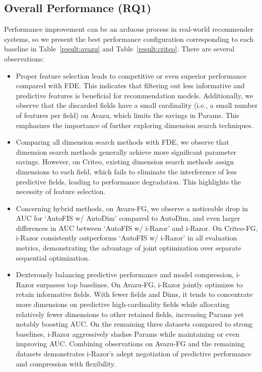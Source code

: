 \documentclass[10pt,journal,compsoc]{IEEEtran}
\begin{document}
\subsection{Overall Performance (RQ1)}
Performance improvement can be an arduous process in real-world recommender systems, so we present the best performance configuration corresponding to each baseline in Table~\ref{result:avazu} and Table~\ref{result:criteo}.
There are several observations:
\begin{itemize}
\item {Proper feature selection leads to competitive or even superior performance compared with FDE. This indicates that filtering out less informative and predictive features is beneficial for recommendation models. Additionally, we observe that the discarded fields have a small cardinality (i.e., a small number of features per field) on Avazu, which limits the savings in Params. This emphasizes the importance of further exploring dimension search techniques.}
\item {Comparing all dimension search methods with FDE, we observe that dimension search methods generally achieve more significant parameter savings. However, on Criteo, existing dimension search methods assign dimensions to each field, which fails to eliminate the interference of less predictive fields, leading to performance degradation. This highlights the necessity of feature selection.}
\item {Concerning hybrid methods, on Avazu-FG, we observe a noticeable drop in AUC for `AutoFIS w/ AutoDim' compared to AutoDim, and even larger differences in AUC between `AutoFIS w/ i-Razor' and i-Razor. On Criteo-FG, i-Razor consistently outperforms `AutoFIS w/ i-Razor' in all evaluation metrics, demonstrating the advantage of joint optimization over separate sequential optimization.}
\item {Dexterously balancing predictive performance and model compression, i-Razor surpasses top baselines. On Avazu-FG, i-Razor jointly optimizes to retain informative fields. With fewer fields and Dims, it tends to concentrate more dimensions on predictive high-cardinality fields while allocating relatively fewer dimensions to other retained fields, increasing Params yet notably boosting AUC. On the remaining three datasets compared to strong baselines, i-Razor aggressively slashes Params while maintaining or even improving AUC. Combining observations on Avazu-FG and the remaining datasets demonstrates i-Razor’s adept negotiation of predictive performance and compression with flexibility.}
\end{itemize}
\end{document}
